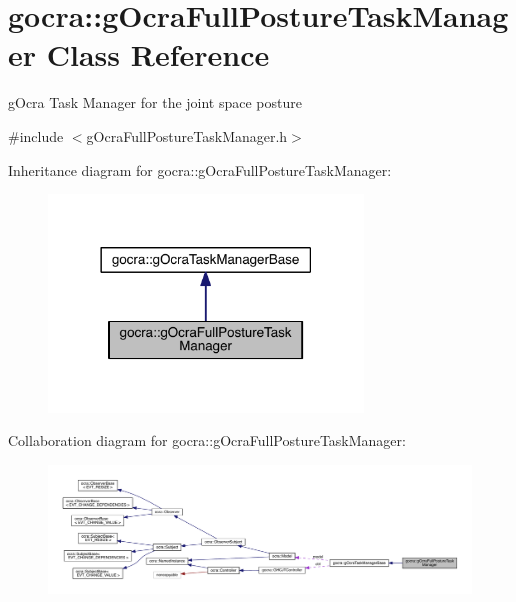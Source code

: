 \hypertarget{classgocra_1_1gOcraFullPostureTaskManager}{}\section{gocra\+:\+:g\+Ocra\+Full\+Posture\+Task\+Manager Class Reference}
\label{classgocra_1_1gOcraFullPostureTaskManager}


g\+Ocra Task Manager for the joint space posture  




{\ttfamily \#include $<$g\+Ocra\+Full\+Posture\+Task\+Manager.\+h$>$}



Inheritance diagram for gocra\+:\+:g\+Ocra\+Full\+Posture\+Task\+Manager\+:\nopagebreak
\begin{figure}[H]
\begin{center}
\leavevmode
\includegraphics[width=237pt]{dc/d1b/classgocra_1_1gOcraFullPostureTaskManager__inherit__graph}
\end{center}
\end{figure}


Collaboration diagram for gocra\+:\+:g\+Ocra\+Full\+Posture\+Task\+Manager\+:\nopagebreak
\begin{figure}[H]
\begin{center}
\leavevmode
\includegraphics[width=350pt]{dc/dfa/classgocra_1_1gOcraFullPostureTaskManager__coll__graph}
\end{center}
\end{figure}
